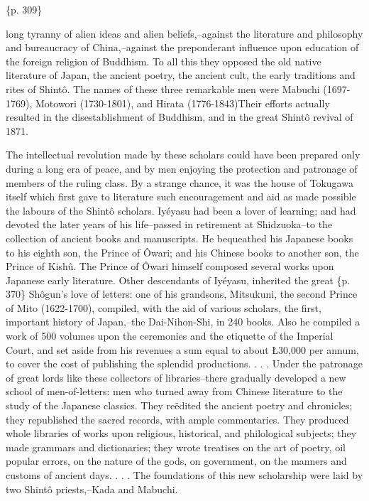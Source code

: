 \{p. 309\}

long tyranny of alien ideas and alien beliefs,--against the literature and philosophy and bureaucracy of China,--against the preponderant influence upon education of the foreign religion of Buddhism. To all this they opposed the old native literature of Japan, the ancient poetry, the ancient cult, the early traditions and rites of Shintô. The names of these three remarkable men were Mabuchi (1697-1769), Motowori (1730-1801), and Hirata (1776-1843)Their efforts actually resulted in the disestablishment of Buddhism, and in the great Shintô revival of 1871.

The intellectual revolution made by these scholars could have been prepared only during a long era of peace, and by men enjoying the protection and patronage of members of the ruling class. By a strange chance, it was the house of Tokugawa itself which first gave to literature such encouragement and aid as made possible the labours of the Shintô scholars. Iyéyasu had been a lover of learning; and had devoted the later years of his life--passed in retirement at Shidzuoka--to the collection of ancient books and manuscripts. He bequeathed his Japanese books to his eighth son, the Prince of Ôwari; and his Chinese books to another son, the Prince of Kishû. The Prince of Ôwari himself composed several works upon Japanese early literature. Other descendants of Iyéyasu, inherited the great \{p. 370\} Shôgun's love of letters: one of his grandsons, Mitsukuni, the second Prince of Mito (1622-1700), compiled, with the aid of various scholars, the first, important history of Japan,--the Dai-Nihon-Shi, in 240 books. Also he compiled a work of 500 volumes upon the ceremonies and the etiquette of the Imperial Court, and set aside from his revenues a sum equal to about Ł30,000 per annum, to cover the cost of publishing the splendid productions. . . . Under the patronage of great lords like these collectors of libraries--there gradually developed a new school of men-of-letters: men who turned away from Chinese literature to the study of the Japanese classics. They reëdited the ancient poetry and chronicles; they republished the sacred records, with ample commentaries. They produced whole libraries of works upon religious, historical, and philological subjects; they made grammars and dictionaries; they wrote treatises on the art of poetry, oil popular errors, on the nature of the gods, on government, on the manners and customs of ancient days. . . . The foundations of this new scholarship were laid by two Shintô priests,--Kada and Mabuchi.

